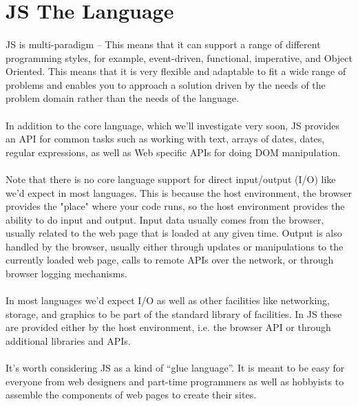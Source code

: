 \section{JS The Language}
\paragraph{} JS is multi-paradigm -- This means that it can support a range of different programming styles, for example, event-driven, functional, imperative, and Object Oriented. This means that it is very flexible and adaptable to fit a wide range of problems and enables you to approach a solution driven by the needs of the problem domain rather than the needs of the language.
\paragraph{} In addition to the core language, which we'll investigate very soon, JS provides an API for common tasks such as working with text, arrays of dates, dates, regular expressions, as well as Web specific APIs for doing DOM manipulation.
\paragraph{} Note that there is no core language support for direct input/output (I/O) like we'd expect in most languages. This is because the host environment, the browser provides the "place" where your code runs, so the host environment provides the ability to do input and output. Input data usually comes from the browser, usually related to the web page that is loaded at any given time. Output is also handled by the browser, usually either through updates or manipulations to the currently loaded web page, calls to remote APIs over the network, or through browser logging mechanisms.
\paragraph{} In most languages we'd expect I/O as well as other facilities like networking, storage, and graphics to be part of the standard library of facilities. In JS these are provided either by the host environment, i.e. the browser API or through additional libraries and APIs.
\paragraph{} It's worth considering JS as a kind of ``glue language''. It is meant to be easy for everyone from web designers and part-time programmers as well as hobbyists to assemble the components of web pages to create their sites.


